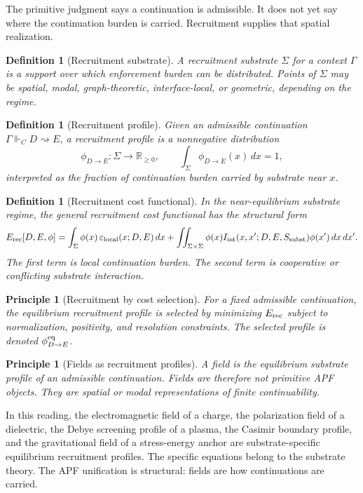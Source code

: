 \documentclass[11pt]{article}
\newtheorem{definition}[theorem]{Definition}
\newtheorem{principle}[theorem]{Principle}
\theoremstyle{remark}
\newcommand{\G}{\Gamma}
\newcommand{\entails}{\Vdash}
\newcommand{\goes}{\rightsquigarrow}
\newcommand{\Erec}{E_{\rm rec}}
\newcommand{\R}{\mathbb R}
\begin{document}
The primitive judgment says a continuation is admissible.  It does not yet say where the continuation burden is carried.  Recruitment supplies that spatial realization.

\begin{definition}[Recruitment substrate]
A recruitment substrate \(\Sigma\) for a context \(\G\) is a support over which enforcement burden can be distributed.  Points of \(\Sigma\) may be spatial, modal, graph-theoretic, interface-local, or geometric, depending on the regime.
\end{definition}

\begin{definition}[Recruitment profile]
Given an admissible continuation \(\G\entails_C D\goes E\), a recruitment profile is a nonnegative distribution
\[
        \phi_{D\to E}:\Sigma\to\R_{\ge0},
        \qquad
        \int_\Sigma \phi_{D\to E}(x)\,dx=1,
\]
interpreted as the fraction of continuation burden carried by substrate near \(x\).
\end{definition}

\begin{definition}[Recruitment cost functional]
In the near-equilibrium substrate regime, the general recruitment cost functional has the structural form
\[
\Erec[D,E,\phi]
=
\int_\Sigma \phi(x)\,\varepsilon_{\rm local}(x;D,E)\,dx
+
\iint_{\Sigma\times\Sigma}\phi(x)I_{\rm int}(x,x';D,E,S_{\rm subst})\phi(x')\,dx\,dx'.
\]
The first term is local continuation burden.  The second term is cooperative or conflicting substrate interaction.
\end{definition}

\begin{principle}[Recruitment by cost selection]
For a fixed admissible continuation, the equilibrium recruitment profile is selected by minimizing \(\Erec\) subject to normalization, positivity, and resolution constraints.  The selected profile is denoted \(\phi^{\rm eq}_{D\to E}\).
\end{principle}

\begin{principle}[Fields as recruitment profiles]
A field is the equilibrium substrate profile of an admissible continuation.  Fields are therefore not primitive APF objects.  They are spatial or modal representations of finite continuability.
\end{principle}

In this reading, the electromagnetic field of a charge, the polarization field of a dielectric, the Debye screening profile of a plasma, the Casimir boundary profile, and the gravitational field of a stress-energy anchor are substrate-specific equilibrium recruitment profiles.  The specific equations belong to the substrate theory.  The APF unification is structural: fields are how continuations are carried.
\end{document}
